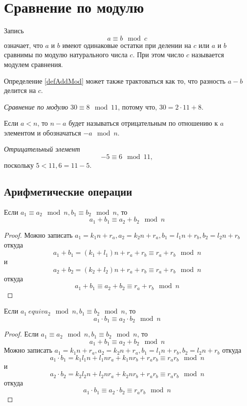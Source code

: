 \section{Сравнение по модулю}
\begin{definition}
Запись 
\begin{equation}
a \equiv b \mod{c}
\label{defAddMod}
\end{equation}
означает, что $a$ и $b$ имеют одинаковые остатки при делении на $c$
или $a$ и $b$ сравнимы по модулю натурального числа $c$. При этом
число $c$ называется модулем сравнения.
\end{definition}

Определение \ref{defAddMod} может также трактоваться как то, что
разность $a - b$ делится на $c$.

\begin{example}
\emph{Сравнение по модулю}
$30 \equiv 8 \mod{11}$, потому что, $30 = 2 \cdot 11 + 8$.
\end{example}

\begin{definition}
Если $a < n$, то $n - a$ будет называться отрицательным по отношению к
$a$ элементом и обозначаться $-a \mod n$.
\end{definition}

\begin{example}
\emph{Отрицательный элемент}
\[
-5 \equiv 6 \mod 11,
\]
поскольку $5 < 11, 6 = 11 - 5$.
\end{example}


\subsection{Арифметические операции}

\begin{lemma}
Если $a_1 \equiv a_2 \mod n, b_1 \equiv b_2 \mod n$, то 
\[
a_1 + b_1 \equiv a_2 + b_2 \mod n
\]
\begin{proof}
Можно записать $a_1 = k_1 n + r_a, a_2 = k_2 n + r_a, b_1 = l_1 n +
r_b, b_2 = l_2 n + r_b$ откуда
\[
a_1 + b_1 = (k_1 + l_1) n + r_a + r_b \equiv r_a + r_b \mod n
\] 
и
\[
a_2 + b_2 = (k_2 + l_2) n + r_a + r_b \equiv r_a + r_b \mod n
\] 
откуда
\[
a_1 + b_1 \equiv a_2 + b_2 \equiv r_a + r_b \mod n
\]
\end{proof}
\end{lemma}

\begin{lemma}
Если $a_1 \ equiv a_2 \mod n, b_1 \equiv b_2 \mod n$, то 
\[
a_1 \cdot b_1 \equiv a_2 \cdot b_2 \mod n
\]
\begin{proof}
Если $a_1 \equiv a_2 \mod n, b_1 \equiv b_2 \mod n$, то 
\[
a_1 + b_1 \equiv a_2 + b_2 \mod n
\]
Можно записать $a_1 = k_1 n + r_a, a_2 = k_2 n + r_a, b_1 = l_1 n +
r_b, b_2 = l_2 n + r_b$ откуда
\[
a_1 \cdot b_1 = k_1 l_1 n + l_1 n r_a + k_1 n r_b + r_a r_b \equiv r_a r_b \mod n
\] 
и
\[
a_2 \cdot b_2 = k_2 l_2 n + l_2 n r_a + k_2 n r_b + r_a r_b \equiv r_a r_b \mod n
\] 
откуда
\[
a_1 \cdot b_1 \equiv a_2 \cdot  b_2 \equiv r_a r_b \mod n
\]
\end{proof}
\end{lemma}

